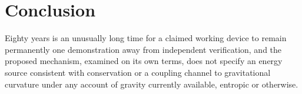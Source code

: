 \documentclass[11pt]{article}
\begin{document}
\section{Conclusion}

Eighty years is an unusually long time for a claimed working device to remain permanently one demonstration away from independent verification, and the proposed mechanism, examined on its own terms, does not specify an energy source consistent with conservation or a coupling channel to gravitational curvature under any account of gravity currently available, entropic or otherwise.
\end{document}
